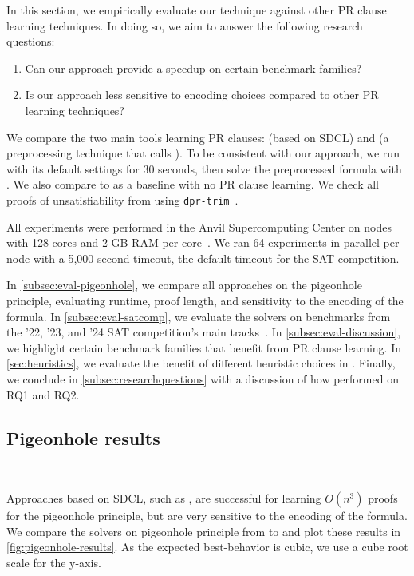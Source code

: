 In this section, we empirically evaluate our technique against other PR clause
learning techniques. In doing so, we aim to answer the following research
questions:


\begin{enumerate}[label={RQ\arabic*}]
    \item Can our approach provide a speedup on certain benchmark families?
    \item Is our approach less sensitive to encoding choices compared to other
    PR learning techniques?
\end{enumerate}


We compare the two main tools learning PR clauses: \sadical (based on SDCL) and
\prelearn (a preprocessing technique that calls \sadical). To be consistent with
our approach, we run \prelearn with its default settings for 30 seconds, then
solve the preprocessed formula with \cadical. We also compare to \cadical as a
baseline with no PR clause learning. We check all proofs of unsatisfiability
from \tool using \texttt{dpr-trim}~\cite{dpr-trim}.

All experiments were performed in the Anvil Supercomputing Center on nodes with
128 cores and 2 GB RAM per core~\cite{anvil}. We ran 64 experiments in parallel
per node with a 5,000 second timeout, the default timeout for the SAT
competition.

In \autoref{subsec:eval-pigeonhole}, we compare all approaches on the pigeonhole
principle, evaluating runtime, proof length, and sensitivity to the encoding of
the formula. In \autoref{subsec:eval-satcomp}, we evaluate the solvers on
benchmarks from the '22, '23, and '24 SAT competition's main
tracks~\cite{satcomp2022,satcomp2023,satcomp2024}. In
\autoref{subsec:eval-discussion}, we highlight certain benchmark families that
benefit from PR clause learning. In \autoref{sec:heuristics}, we evaluate the 
benefit of different heuristic choices in \tool. Finally, we conclude in 
\autoref{subsec:researchquestions} with a discussion of how performed on RQ1 and 
RQ2.


\subsection{Pigeonhole results}~\label{subsec:eval-pigeonhole}


Approaches based on SDCL, such as \sadical, are successful for learning $O(n^3)$
proofs for the pigeonhole principle, but are very sensitive to the encoding of
the formula. We compare the solvers on pigeonhole principle from  to
 and plot these results in \autoref{fig:pigeonhole-results}. As the
expected best-behavior is cubic, we use a cube root scale for the y-axis.

